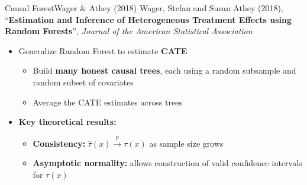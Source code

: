 \documentclass[hyperref={pdfpagelabels=false}]{beamer}
\begin{document}
\begin{frame}{Causal Forest}{Wager \& Athey (2018)}
	Wager, Stefan and Susan Athey (2018), ``\textbf{Estimation and Inference of Heterogeneous Treatment Effects using Random Forests}'', \textit{Journal of the American Statistical Association}

	\vspace{0.3cm}
	\begin{itemize}
		\item Generalize Random Forest to estimate \textbf{CATE}
		\vspace{0.2cm}
		\begin{itemize}
			\item Build \textbf{many honest causal trees}, each using a random subsample and random subset of covariates
			\vspace{0.2cm}
			\item Average the CATE estimates across trees
		\end{itemize}
		\vspace{0.3cm}
		\item \textbf{Key theoretical results:}
		\vspace{0.2cm}
		\begin{itemize}
			\item \textbf{Consistency:} $\hat{\tau}(x) \xrightarrow{p} \tau(x)$ as sample size grows
			\vspace{0.2cm}
			\item \textbf{Asymptotic normality:} allows construction of valid confidence intervals for $\tau(x)$
		\end{itemize}
	\end{itemize}
\end{frame}
\end{document}
